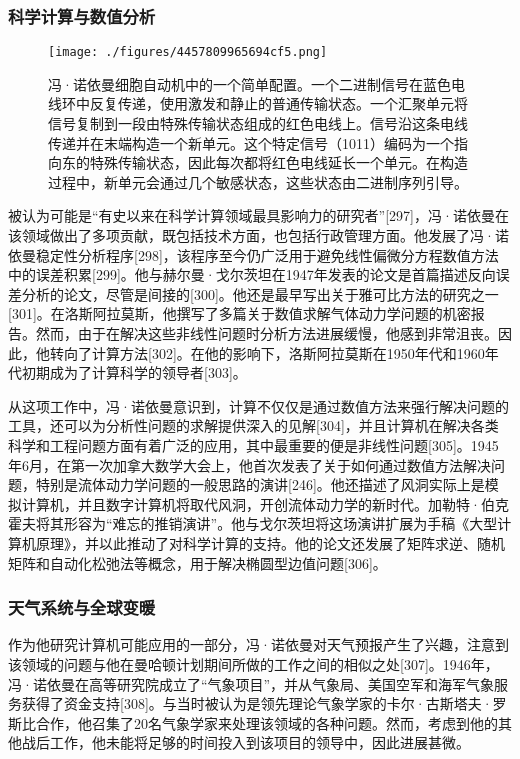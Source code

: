 \subsubsection{科学计算与数值分析}
\begin{figure}[ht]
\centering
\texttt{[image: ./figures/4457809965694cf5.png]}
\caption{冯·诺依曼细胞自动机中的一个简单配置。一个二进制信号在蓝色电线环中反复传递，使用激发和静止的普通传输状态。一个汇聚单元将信号复制到一段由特殊传输状态组成的红色电线上。信号沿这条电线传递并在末端构造一个新单元。这个特定信号（1011）编码为一个指向东的特殊传输状态，因此每次都将红色电线延长一个单元。在构造过程中，新单元会通过几个敏感状态，这些状态由二进制序列引导。} \label{fig_Neuman_10}
\end{figure}
被认为可能是“有史以来在科学计算领域最具影响力的研究者”[297]，冯·诺依曼在该领域做出了多项贡献，既包括技术方面，也包括行政管理方面。他发展了冯·诺依曼稳定性分析程序[298]，该程序至今仍广泛用于避免线性偏微分方程数值方法中的误差积累[299]。他与赫尔曼·戈尔茨坦在1947年发表的论文是首篇描述反向误差分析的论文，尽管是间接的[300]。他还是最早写出关于雅可比方法的研究之一[301]。在洛斯阿拉莫斯，他撰写了多篇关于数值求解气体动力学问题的机密报告。然而，由于在解决这些非线性问题时分析方法进展缓慢，他感到非常沮丧。因此，他转向了计算方法[302]。在他的影响下，洛斯阿拉莫斯在1950年代和1960年代初期成为了计算科学的领导者[303]。

从这项工作中，冯·诺依曼意识到，计算不仅仅是通过数值方法来强行解决问题的工具，还可以为分析性问题的求解提供深入的见解[304]，并且计算机在解决各类科学和工程问题方面有着广泛的应用，其中最重要的便是非线性问题[305]。1945年6月，在第一次加拿大数学大会上，他首次发表了关于如何通过数值方法解决问题，特别是流体动力学问题的一般思路的演讲[246]。他还描述了风洞实际上是模拟计算机，并且数字计算机将取代风洞，开创流体动力学的新时代。加勒特·伯克霍夫将其形容为“难忘的推销演讲”。他与戈尔茨坦将这场演讲扩展为手稿《大型计算机原理》，并以此推动了对科学计算的支持。他的论文还发展了矩阵求逆、随机矩阵和自动化松弛法等概念，用于解决椭圆型边值问题[306]。
\subsubsection{天气系统与全球变暖}  
作为他研究计算机可能应用的一部分，冯·诺依曼对天气预报产生了兴趣，注意到该领域的问题与他在曼哈顿计划期间所做的工作之间的相似之处[307]。1946年，冯·诺依曼在高等研究院成立了“气象项目”，并从气象局、美国空军和海军气象服务获得了资金支持[308]。与当时被认为是领先理论气象学家的卡尔·古斯塔夫·罗斯比合作，他召集了20名气象学家来处理该领域的各种问题。然而，考虑到他的其他战后工作，他未能将足够的时间投入到该项目的领导中，因此进展甚微。

